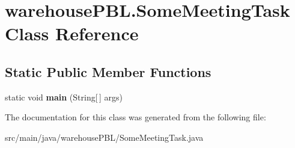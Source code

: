 \hypertarget{classwarehouse_p_b_l_1_1_some_meeting_task}{}\section{warehouse\+P\+B\+L.\+Some\+Meeting\+Task Class Reference}
\label{classwarehouse_p_b_l_1_1_some_meeting_task}
\subsection*{Static Public Member Functions}
\begin{DoxyCompactItemize}
\item 
\mbox{\label{classwarehouse_p_b_l_1_1_some_meeting_task_ad32631746dce91be3960491cfbd02ee8}} 
static void {\bfseries main} (String\mbox{[}$\,$\mbox{]} args)
\end{DoxyCompactItemize}


The documentation for this class was generated from the following file\+:\begin{DoxyCompactItemize}
\item 
src/main/java/warehouse\+P\+B\+L/Some\+Meeting\+Task.\+java\end{DoxyCompactItemize}

